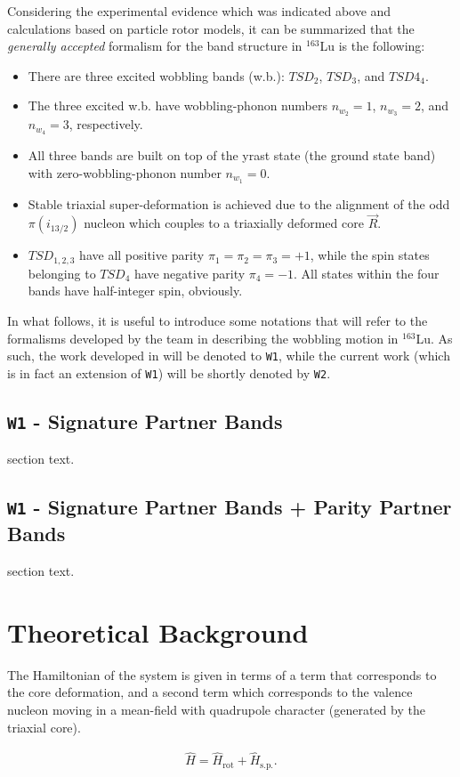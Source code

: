 \documentclass[11pt]{article}
\begin{document}
Considering the experimental evidence which was indicated above and calculations based on particle rotor models, it can be summarized that the \emph{generally accepted} formalism for the band structure in $^{163}$Lu is the following:
\begin{itemize}
    \item There are three excited wobbling bands (w.b.): $TSD_2$, $TSD_3$, and $TSD4_4$.
    \item The three excited w.b. have wobbling-phonon numbers $n_{w_2}=1$, $n_{w_3}=2$, and $n_{w_4}=3$, respectively.
    \item All three bands are built on top of the yrast state (the ground state band) with zero-wobbling-phonon number $n_{w_1}=0$.
    \item Stable triaxial super-deformation is achieved due to the alignment of the odd $\pi(i_{13/2})$ nucleon which couples to a triaxially deformed core $\vec{R}$.
    \item $TSD_{1,2,3}$ have all positive parity $\pi_1=\pi_2=\pi_3=+1$, while the spin states belonging to $TSD_4$ have negative parity $\pi_4=-1$. All states within the four bands have half-integer spin, obviously.
 \end{itemize}

In what follows, it is useful to introduce some notations that will refer to the formalisms developed by the team in describing the wobbling motion in $^{163}$Lu. As such, the work developed in \cite{raduta2020approach,raduta2020towards} will be denoted to \texttt{W1}, while the current work (which is in fact an extension of \texttt{W1}) will be shortly denoted by \texttt{W2}.

\subsection{\texttt{W1} - Signature Partner Bands}

section text.
 
\subsection{\texttt{W1} - Signature Partner Bands + Parity Partner Bands}

section text.

\section{Theoretical Background}

The Hamiltonian of the system is given in terms of a term that corresponds to the core deformation, and a second term which corresponds to the valence nucleon moving in a mean-field with quadrupole character (generated by the triaxial core).

\begin{align}
    \hat{H}=\hat{H}_\text{rot}+\hat{H}_\text{s.p.}.
\end{align}



\end{document}
